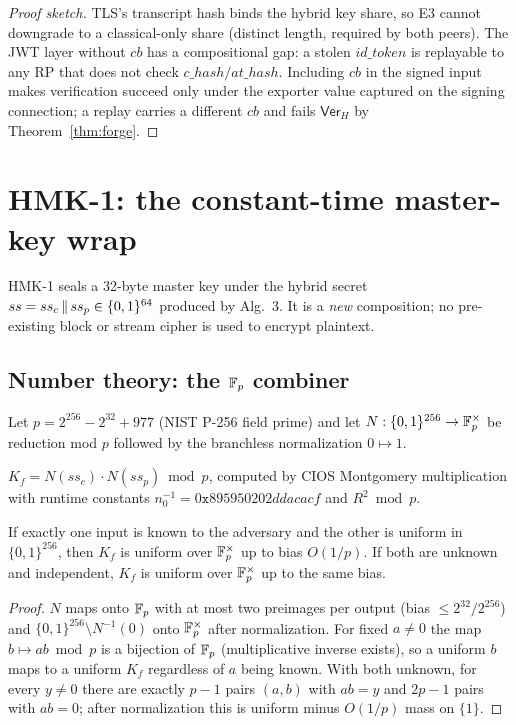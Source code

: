 \begin{proof}[Proof sketch]
TLS's transcript hash binds the hybrid key share, so E3 cannot downgrade to a
classical-only share (distinct length, required by both peers). The JWT layer
without $cb$ has a compositional gap: a stolen $\mathit{id\_token}$ is
replayable to any RP that does not check $\mathit{c\_hash}/\mathit{at\_hash}$.
Including $cb$ in the signed input makes verification succeed only under the
exporter value captured on the signing connection; a replay carries a
different $cb$ and fails $\mathsf{Ver}_H$ by Theorem~\ref{thm:forge}.
\end{proof}

\section{HMK-1: the constant-time master-key wrap}
\label{sec:hmk}
HMK-1 seals a 32-byte master key under the hybrid secret
$ss = ss_c \,\|\, ss_p \in \{0,1\}^{64}$ produced by Alg.~3. It is a
\emph{new} composition; no pre-existing block or stream cipher is used to
encrypt plaintext.

\subsection{Number theory: the $\mathbb{F}_p$ combiner}
Let $p = 2^{256} - 2^{32} + 977$ (NIST P-256 field prime) and let
$N: \{0,1\}^{256} \to \mathbb{F}_p^{\times}$ be reduction mod $p$ followed by the
branchless normalization $0 \mapsto 1$.

\begin{definition}
$K_f = N(ss_c) \cdot N(ss_p) \bmod p$, computed by CIOS Montgomery
multiplication with runtime constants
$n_0^{-1} = 0\texttt{x}895950202ddacacf$ and $R^2 \bmod p$.
\end{definition}

\begin{proposition}
\label{prop:onebreak}
If exactly one input is known to the adversary and the other is uniform in
$\{0,1\}^{256}$, then $K_f$ is uniform over $\mathbb{F}_p^{\times}$ up to bias
$O(1/p)$. If both are unknown and independent, $K_f$ is uniform over
$\mathbb{F}_p^{\times}$ up to the same bias.
\end{proposition}

\begin{proof}
$N$ maps onto $\mathbb{F}_p$ with at most two preimages per output (bias $\le
2^{32}/2^{256}$) and $\{0,1\}^{256}\setminus N^{-1}(0)$ onto
$\mathbb{F}_p^{\times}$ after normalization. For fixed $a \ne 0$ the map
$b \mapsto ab \bmod p$ is a bijection of $\mathbb{F}_p$ (multiplicative inverse
exists), so a uniform $b$ maps to a uniform $K_f$ regardless of $a$ being
known. With both unknown, for every $y \ne 0$ there are exactly $p-1$ pairs
$(a,b)$ with $ab = y$ and $2p-1$ pairs with $ab = 0$; after normalization
this is uniform minus $O(1/p)$ mass on $\{1\}$.
\end{proof}

